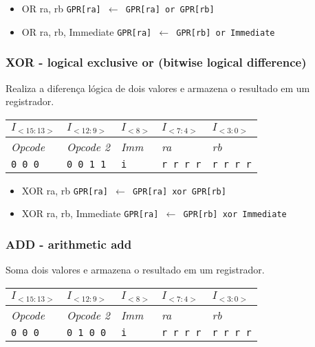 \documentclass[11pt,a4paper]{report}
\begin{document}
\begin{itemize}
\item OR ra, rb
\subitem \texttt{GPR[ra] $\leftarrow$ GPR[ra] or GPR[rb]}
\item OR ra, rb, Immediate
\subitem \texttt{GPR[ra] $\leftarrow$ GPR[rb] or Immediate}
\end{itemize}

\subsubsection{XOR - logical exclusive or (bitwise logical difference)}
Realiza a diferença lógica de dois valores e armazena o resultado em um
registrador.

\begin{table}[htb!]
\centering
\begin{tabular}{|p{2cm}|p{2cm}|p{2cm}|p{2cm}|p{2cm}|}
\hline
$I_{<15:13>}$ & $I_{<12:9>}$ & $I_{<8>}$ & $I_{<7:4>}$ & $I_{<3:0>}$  \\ \hline
\textit{Opcode} & \textit{Opcode 2} & \textit{Imm} & \textit{ra} & \textit{rb} \\ \hline
\texttt{0 0 0} & \texttt{0 0 1 1} & \texttt{i} & \texttt{r r r r} & \texttt{r r r r} \\ \hline
\end{tabular}
\end{table}

\begin{itemize}
\item XOR ra, rb
\subitem \texttt{GPR[ra] $\leftarrow$ GPR[ra] xor GPR[rb]}
\item XOR ra, rb, Immediate
\subitem \texttt{GPR[ra] $\leftarrow$ GPR[rb] xor Immediate}
\end{itemize}

\subsubsection{ADD - arithmetic add}
Soma dois valores e armazena o resultado em um registrador.

\begin{table}[htb!]
\centering
\begin{tabular}{|p{2cm}|p{2cm}|p{2cm}|p{2cm}|p{2cm}|}
\hline
$I_{<15:13>}$ & $I_{<12:9>}$ & $I_{<8>}$ & $I_{<7:4>}$ & $I_{<3:0>}$  \\ \hline
\textit{Opcode} & \textit{Opcode 2} & \textit{Imm} & \textit{ra} & \textit{rb} \\ \hline
\texttt{0 0 0} & \texttt{0 1 0 0} & \texttt{i} & \texttt{r r r r} & \texttt{r r r r} \\ \hline
\end{tabular}
\end{table}
\end{document}

